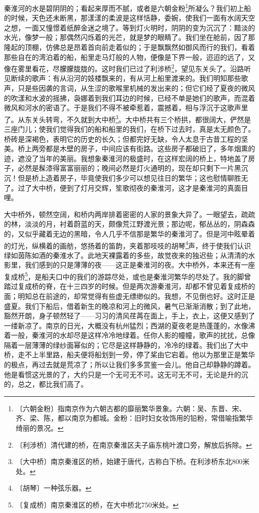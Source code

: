 \documentclass[12pt,UTF-8,openany]{ctexbook}
\begin{document}
\begin{normalsize}
    秦淮河的水是碧阴阴的；看起来厚而不腻，或者是六朝金粉\footnote{〔六朝金粉〕指南京作为六朝古都的靡丽繁华景象。六朝：吴、东晋、宋、齐、梁、陈，都以南京为都城。金粉：旧时妇女妆饰用的铅粉，常借喻指繁华绮丽的景况。}所凝么？我们初上船的时候，天色还未断黑，那漾漾的柔波是这样恬静，委婉，使我们一面有水阔天空之想，一面又憧憬着纸醉金迷之境了。等到灯火明时，阴阴的变为沉沉了：黯淡的水光，像梦一般；那偶然闪烁着的光芒，就是梦的眼睛了。我们坐在舱前，因了那隆起的顶棚，仿佛总是昂着首向前走着似的；于是飘飘然如御风而行的我们，看着那些自在的湾泊着的船，船里走马灯般的人物，便像是下界一般，迢迢的远了，又像在雾里看花，尽朦朦胧胧的。这时我们已过了利涉桥\footnote{〔利涉桥〕清代建的桥，在南京秦淮区夫子庙东桃叶渡口旁，解放后拆除。}，望见东关头了。沿路听见断续的歌声：有从沿河的妓楼飘来的，有从河上船里渡来的。我们明知那些歌声，只是些因袭的言词，从生涩的歌喉里机械的发出来的；但它们经了夏夜的微风的吹漾和水波的摇拂，袅娜着到我们耳边的时候，已经不单是她们的歌声，而混着微风和河水的密语了。于是我们不得不被牵惹着，震撼着，相与浮沉于这歌声里了。从东关头转弯，不久就到大中桥\footnote{〔大中桥〕南京秦淮区的桥，始建于唐代，古称白下桥。在利涉桥东北800米处。}。大中桥共有三个桥拱，都很阔大，俨然是三座门儿；使我们觉得我们的船和船里的我们，在桥下过去时，真是太无颜色了。桥砖是深褐色，表明它的历史的长久；但都完好无缺，令人太息于古昔工程的坚美。桥上两旁都是木壁的房子，中间应该有街路。这些房子都破旧了，多年烟熏的迹，遮没了当年的美丽。我想象秦淮河的极盛时，在这样宏阔的桥上，特地盖了房子，必然是髹漆得富富丽丽的；晚间必然是灯火通明的，现在却只剩下一片黑沉沉！但是桥上造着房子，毕竟使我们多少可以想见往日的繁华；这也慰情聊胜无了。过了大中桥，便到了灯月交辉，笙歌彻夜的秦淮河，这才是秦淮河的真面目哩。
    
    大中桥外，顿然空阔，和桥内两岸排着密密的人家的景象大异了。一眼望去，疏疏的林，淡淡的月，衬着蔚蓝的天，颇像荒江野渡光景；那边呢，郁丛丛的，阴森森的，又似乎藏着无边的黑暗，令人几乎不信那是繁华的秦淮河了。但是河中眩晕着的灯光，纵横着的画舫，悠扬着的笛韵，夹着那吱吱的胡琴\footnote{〔胡琴〕一种弦乐器。}声，终于使我们认识绿如茵陈如酒的秦淮水了。此地天裸露着的多些，故觉夜来的独迟些；从清清的水影里，我们感到的只是薄薄的夜——这正是秦淮河的夜。大中桥外，本来还有一座复成桥\footnote{〔复成桥〕南京秦淮区的桥，在大中桥北750米处。}，是船夫口中的我们的游踪尽处，或也是秦淮河繁华的尽处了。我的脚曾踏过复成桥的脊，在十三四岁的时候。但是两次游秦淮河，却都不曾见着复成桥的面；明知总在前途的，却常觉得有些虚无缥缈似的。我想，不见倒也好。这时正是盛夏。我们下船后，借着新生的晚凉和河上的微风，暑气已渐渐消散；到了此地，豁然开朗，身子顿然轻了——习习的清风荏苒在面上，手上，衣上，这便又感到了一缕新凉了。南京的日光，大概没有杭州猛烈；西湖的夏夜老是热蓬蓬的，水像沸着一般，秦淮河的水却尽是这样冷冷地绿着。任你人影的幢幢，歌声的扰扰，总像隔着一层薄薄的绿纱面幂似的；它尽是这样静静的，冷冷的绿着。我们出了大中桥，走不上半里路，船夫便将船划到一旁，停了桨由它宕着。他以为那里正是繁华的极点，再过去就是荒凉了；所以让我们多多赏鉴一会儿。他自己却静静的蹲着。他是看惯这光景的了，大约只是一个无可无不可。这无可无不可，无论是升的沉的，总之，都比我们高了。
    

\end{normalsize}
\end{document}
